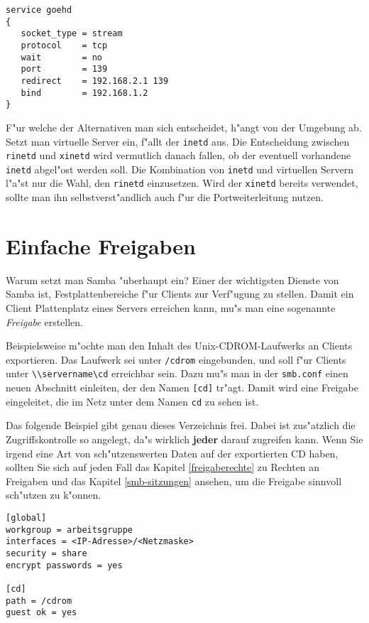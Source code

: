 \documentclass{scrartcl}\usepackage{pslatex}\typearea{12}
\newcommand{\prog}{\texttt}
\newcommand{\param}{\texttt}
\newcommand{\dateistyle}{\texttt}
\newcommand{\nbname}{\texttt}
\begin{document}
\begin{verbatim}
service goehd
{
   socket_type = stream
   protocol    = tcp
   wait        = no
   port        = 139
   redirect    = 192.168.2.1 139
   bind        = 192.168.1.2
}
\end{verbatim}

F"ur welche der Alternativen man sich entscheidet, h"angt von der
Umgebung ab. Setzt man virtuelle Server ein, f"allt der \prog{inetd}
aus. Die Entscheidung zwischen \prog{rinetd} und \prog{xinetd} wird
vermutlich danach fallen, ob der eventuell vorhandene \prog{inetd}
abgel"ost werden soll. Die Kombination von \prog{inetd} und virtuellen
Servern l"a"st nur die Wahl, den \prog{rinetd} einzusetzen. Wird der
\prog{xinetd} bereits verwendet, sollte man ihn selbstverst"andlich
auch f"ur die Portweiterleitung nutzen.

\section{Einfache Freigaben}

Warum setzt man Samba "uberhaupt ein? Einer der wichtigsten Dienste
von Samba ist, Festplattenbereiche f"ur Clients zur Verf"ugung zu
stellen. Damit ein Client Plattenplatz eines Servers erreichen kann,
mu"s man eine sogenannte \emph{Freigabe} erstellen.

Beispielsweise m"ochte man den Inhalt des Unix-CDROM-Laufwerks an
Clients exportieren. Das Laufwerk sei unter \dateistyle{/cdrom}
eingebunden, und soll f"ur Clients unter
\nbname{\textbackslash{}\textbackslash{}servername\textbackslash{}cd}
erreichbar sein. Dazu mu"s man in der \dateistyle{smb.conf} einen
neuen Abschnitt einleiten, der den Namen \param{[cd]} tr"agt. Damit
wird eine Freigabe eingeleitet, die im Netz unter dem Namen
\nbname{cd} zu sehen ist.

Das folgende Beispiel gibt genau dieses Verzeichnis frei. Dabei ist
zus"atzlich die Zugriffskontrolle so angelegt, da"s wirklich
\textbf{jeder} darauf zugreifen kann. Wenn Sie irgend eine Art von
sch"utzenswerten Daten auf der exportierten CD haben, sollten Sie sich
auf jeden Fall das Kapitel \ref{freigaberechte} zu Rechten an
Freigaben und das Kapitel \ref{smb-sitzungen} ansehen, um die Freigabe
sinnvoll sch"utzen zu k"onnen.

\begin{verbatim}
[global]
workgroup = arbeitsgruppe
interfaces = <IP-Adresse>/<Netzmaske>
security = share
encrypt passwords = yes

[cd]
path = /cdrom
guest ok = yes
\end{verbatim}
\end{document}
